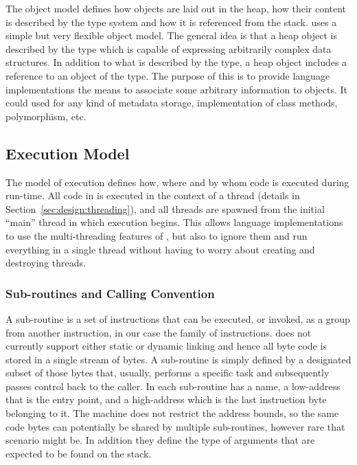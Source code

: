 The object model defines how objects are laid out in the heap, how their content
is described by the type system and how it is referenced from the
stack. \thename{} uses a simple but very flexible object model. The general idea
is that a heap object is described by the  type which is capable
of expressing arbitrarily complex data structures. In addition to what is
described by the type, a heap object includes a reference to an object of the
 type. The purpose of this is to provide language implementations
the means to associate some arbitrary information to objects. It could used for
any kind of metadata storage, implementation of class methods, polymorphism,
etc.

\subsection{Execution Model}
\label{sec:design:exec}

The model of execution defines how, where and by whom code is executed during
run-time. All code in \thename{} is executed in the context of a thread (details
in Section~\ref{sec:design:threading}), and all threads are spawned from the
initial ``main'' thread in which execution begins. This allows language
implementations to use the multi-threading features of \thename{}, but also to
ignore them and run everything in a single thread without having to worry about
creating and destroying threads.

\subsubsection{Sub-routines and Calling Convention}
\label{sec:design:exec:sub-routine}

A sub-routine is a set of instructions that can be executed, or invoked, as a
group from another instruction, in our case the  family of
instructions. \thename{} does not currently support either static or dynamic
linking and hence all byte code is stored in a single stream of bytes. A
sub-routine is simply defined by a designated subset of those bytes that,
usually, performs a specific task and subsequently passes control back to the
caller. In \thename{} each sub-routine has a name, a low-address that is the
entry point, and a high-address which is the last instruction byte belonging to
it. The machine does not restrict the address bounds, so the same code bytes can
potentially be shared by multiple sub-routines, however rare that scenario might
be. In addition they define the type of arguments that are expected to be found
on the stack.

